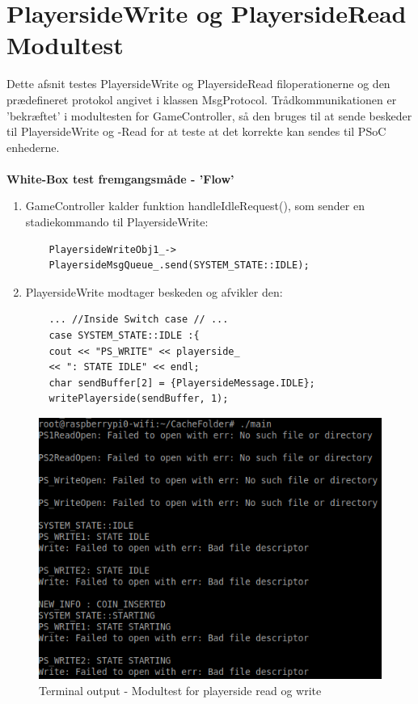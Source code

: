 \documentclass[Modultest/Modultest_main.tex]{subfiles}
\begin{document}
\section{PlayersideWrite og PlayersideRead Modultest}
Dette afsnit testes PlayersideWrite og PlayersideRead filoperationerne og den prædefineret protokol angivet i klassen MsgProtocol. Trådkommunikationen er 'bekræftet' i modultesten for GameController, så den bruges til at sende beskeder til PlayersideWrite og -Read for at teste at det korrekte kan sendes til PSoC enhederne. \\\\
\textbf{White-Box test fremgangsmåde - 'Flow'}
\begin{enumerate}
    \item GameController kalder funktion handleIdleRequest(), som sender en stadiekommando til PlayersideWrite: 
    \begin{lstlisting}
    PlayersideWriteObj1_->
    PlayersideMsgQueue_.send(SYSTEM_STATE::IDLE);
    \end{lstlisting}
    \item PlayersideWrite modtager beskeden og afvikler den: 
    \begin{lstlisting}
    ... //Inside Switch case // ... 
    case SYSTEM_STATE::IDLE :{
	cout << "PS_WRITE" << playerside_ 
	<< ": STATE IDLE" << endl;
	char sendBuffer[2] = {PlayersideMessage.IDLE};
	writePlayerside(sendBuffer, 1); 
    \end{lstlisting}
\end{enumerate}
\begin{figure}[H]
    \centering
    \includegraphics[width=\textwidth]{Modultest/GameController/graphic/Modultest_ps.png}
    \caption{Terminal output - Modultest for playerside read og write}
    \label{fig:test_playerside}
\end{figure}
\end{document}
